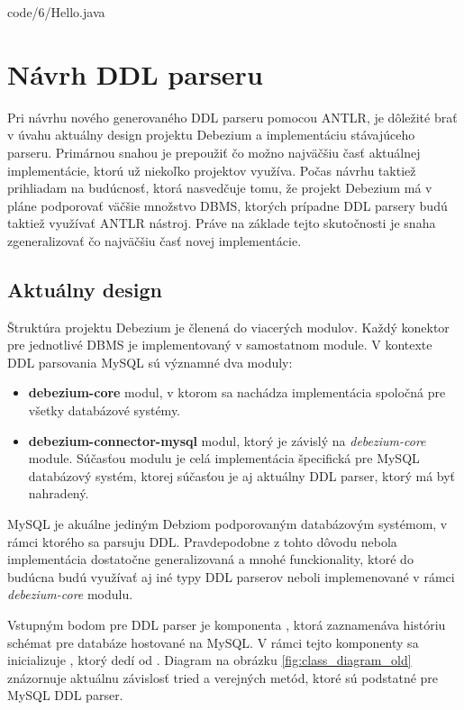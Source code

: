 \begin{minipage}{\linewidth}

            {code/6/Hello.java}
\end{minipage}

\section{Návrh DDL parseru}
Pri návrhu nového generovaného DDL parseru pomocou ANTLR, je dôležité brať v úvahu aktuálny design projektu Debezium a implementáciu stávajúceho parseru. Primárnou snahou je prepoužiť čo možno najväčšiu časť aktuálnej implementácie, ktorú už niekoľko projektov využíva. Počas návrhu taktiež prihliadam na budúcnosť, ktorá nasvedčuje tomu, že projekt Debezium má v pláne podporovať väčšie množstvo DBMS, ktorých prípadne DDL parsery budú taktiež využívať ANTLR nástroj. Práve na základe tejto skutočnosti je snaha zgeneralizovať čo najväčšiu časť novej implementácie.

\subsection{Aktuálny design}\label{old_design}
Štruktúra projektu Debezium je členená do viacerých modulov. Každý konektor pre jednotlivé DBMS je implementovaný v samostatnom module. V kontexte DDL parsovania MySQL sú významné dva moduly:
\begin{itemize}
\item \textbf{debezium-core} modul, v ktorom sa nachádza implementácia spoločná pre všetky databázové systémy.
\item \textbf{debezium-connector-mysql} modul, ktorý je závislý na \textit{debezium-core} module. Súčasťou modulu je celá implementácia špecifická pre MySQL databázový systém, ktorej súčasťou je aj aktuálny DDL parser, ktorý má byť nahradený.
\end{itemize}

MySQL je akuálne jediným Debziom podporovaným databázovým systémom, v rámci ktorého sa parsuju DDL. Pravdepodobne z tohto dôvodu nebola implementácia dostatočne generalizovaná a mnohé funckionality, ktoré do budúcna budú využívať aj iné typy DDL parserov neboli implemenované v rámci \textit{debezium-core} modulu.

Vstupným bodom pre DDL parser je komponenta , ktorá zaznamenáva históriu schémat pre databáze hostované na MySQL. V rámci tejto komponenty sa inicializuje , ktorý dedí od . Diagram na obrázku \ref{fig:class_diagram_old} znázornuje aktuálnu závislosť tried a verejných metód, ktoré sú podstatné pre MySQL DDL parser.

